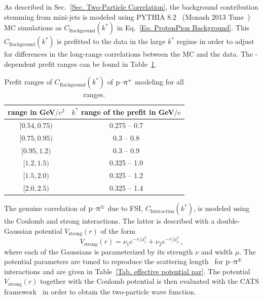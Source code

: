 \documentclass[ALICE,manyauthors]{cernphprep}
\begin{document}
As described in Sec.~\ref{Sec. Two-Particle Correlation}, the background contribution stemming from mini-jets is modeled using PYTHIA 8.2~\cite{Sjostrand:2014zea} (Monash 2013 Tune~\cite{Skands:2014pea}) MC simulations as $C_\text{Background}(k^*)$ in Eq.~\eqref{Eq. ProtonPion Background}. This $C_\text{Background}(k^*)$ is prefitted to the data in the large $k^*$ regime in order to adjust for differences in the long-range correlations between the MC and the data. The \mtText-dependent prefit ranges can be found in Table~\ref{Tab. ProtonPion PrefitRanges}.
\begin{table}[h]
    \centering
    \begin{tabular}{| c | c |}
    \hline
        \mtText{} range in GeV$/c^2$ & $k^*$ range of the prefit in  GeV$/c$ \\
        \hline
        \hline
        $[0.54, 0.75)$ & 0.275 -- 0.7\\
        $[0.75, 0.95)$ & 0.3 -- 0.8\\
        $[0.95, 1.2)$ & 0.3 -- 0.9\\
        $[1.2, 1.5)$ & 0.325 -- 1.0\\
        $[1.5, 2.0)$ & 0.325 -- 1.2\\
        $[2.0, 2.5)$ & 0.325 -- 1.4\\
        \hline
    \end{tabular}
    \caption{Prefit ranges of $C_\text{Background}(k^*)$ of $\text{p--}\uppi^+$ modeling for all \mtText{} ranges.}
    \label{Tab. ProtonPion PrefitRanges}
\end{table}

The genuine correlation of $\text{p--}\uppi^\pm$ due to FSI, $C_\text{Interaction}(k^*)$, is modeled using the Coulomb and strong interactions. The latter is described with a double-Gaussian potential $V_\text{strong}(r)$ of the form
\begin{equation}
    V_\text{strong}(r) = \nu_1 e^{-r/\mu_1^2} + \nu_2 e^{-r/\mu_2^2}\,, \label{Eq. Double Gauss}
\end{equation}
where each of the Gaussians is parameterized by its strength $\nu$ and width $\mu$. The potential parameters are tuned to reproduce the scattering length~\cite{Hoferichter:2015hva} for $\text{p--}\uppi^\pm$ interactions and are given in Table~\ref{Tab. effective potential par}.  The potential $V_\text{strong}(r)$ together with the Coulomb potential is then evaluated with the
CATS framework~\cite{Mihaylov:2018rva} in order to obtain the two-particle wave function.
\end{document}
